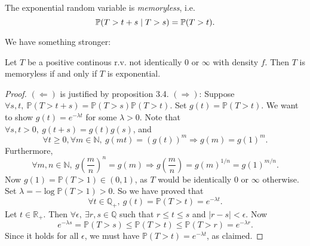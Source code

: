 \begin{proposition}
    The exponential random variable is \emph{memoryless}, i.e.
    \[
        {\mathbb{P}}(T > t+s \mid T>s) = {\mathbb{P}}(T>t).
    \]
\end{proposition}
We have something stronger:
\begin{proposition}
    Let $ T $ be a positive continous r.v. not identically $0$ or $ \infty $ with density $f$. Then $T$ is memoryless if and only if $T$ is exponential.
\end{proposition}
\begin{proof}
    $ (\Leftarrow) $ is justified by proposition 3.4. $ (\Rightarrow ) $: Suppose $ \forall s,t,\ \mathbb{P}(T>t+s)=\mathbb{P}(T>s)\mathbb{P}(T>t) $. Set $ g(t)=\mathbb{P}(T>t) $. We want to show $ g(t)=e^{-\lambda t} $ for some $ \lambda>0 $. Note that $ \forall s,t>0,\ g(t+s)=g(t)g(s) $, and 
    \[
        \forall t\ge 0, \forall m\in \mathbb{N},\ g(mt)=(g(t))^m \Longrightarrow g(m)=g(1)^m.
    \]
    Furthermore, 
    \[
        \forall m,n\in \mathbb{N},\ g\left( \frac{m}{n} \right)^n=g(m) \Longrightarrow g\left( \frac{m}{n} \right)= g(m)^{1/n}=g(1)^{m/n}.
    \]
    Now $ g(1)=\mathbb{P}(T>1)\in (0,1) $, as $T$ would be identically $0$ or $ \infty $ otherwise. Set $ \lambda=-\log \mathbb{P}(T>1)>0 $. So we have proved that 
    \[
        \forall t\in \mathbb{Q}_+,\ g(t)=\mathbb{P}(T>t)=e^{-\lambda t}.
    \]
    Let $ t\in \mathbb{R}_+ $. Then $ \forall \epsilon,\ \exists r,s\in \mathbb{Q} $ such that $ r\le t\le s $ and $ |r-s|<\epsilon $. Now
    \[
        e^{-\lambda s}=\mathbb{P}(T>s)\le \mathbb{P}(T>t)\le \mathbb{P}(T>r) = e^{-\lambda r}.
    \]
    Since it holds for all $ \epsilon $, we must have $ \mathbb{P}(T>t)=e^{-\lambda t} $, as claimed.
\end{proof}

